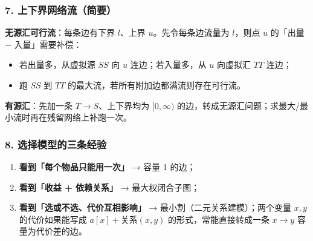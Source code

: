 \subsubsection*{7. 上下界网络流（简要）}

\textbf{无源汇可行流}：每条边有下界 $l$、上界 $u$。先令每条边流量为 $l$，则点 $u$ 的「出量 $-$ 入量」需要补偿：
\begin{itemize}
    \item 若出量多，从虚拟源 $SS$ 向 $u$ 连边；若入量多，从 $u$ 向虚拟汇 $TT$ 连边；
    \item 跑 $SS$ 到 $TT$ 的最大流，若所有附加边都满流则存在可行流。
\end{itemize}

\textbf{有源汇}：先加一条 $T\to S$、上下界均为 $[0,\infty)$ 的边，转成无源汇问题；求最大/最小流时再在残留网络上补跑一次。

\subsubsection*{8. 选择模型的三条经验}

\begin{enumerate}
    \item \textbf{看到「每个物品只能用一次」} → 容量 1 的边；
    \item \textbf{看到「收益 + 依赖关系」} → 最大权闭合子图；
    \item \textbf{看到「选或不选、代价互相影响」} → 最小割（二元关系建模）；两个变量 $x,y$ 的代价如果能写成
    $a[x]+\text{关系}(x,y)$ 的形式，常能直接转成一条 $x\to y$ 容量为代价差的边。
\end{enumerate}
